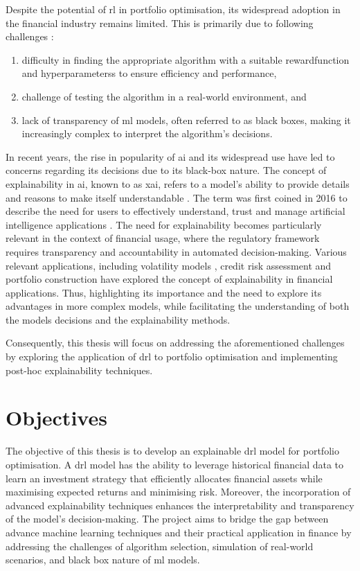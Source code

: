 Despite the potential of \acrshort{rl} in portfolio optimisation, its widespread adoption in the financial industry remains limited. This is primarily due to following challenges \cite{Cortes2024}:
\begin{enumerate}
    \item difficulty in finding the appropriate algorithm with a suitable \gls{rewardfunction} and \glspl{hyperparameters} to ensure efficiency and performance,
    \item challenge of testing the algorithm in a real-world environment, and
    \item lack of transparency of \acrshort{ml} models, often referred to as black boxes, making it increasingly complex to interpret the algorithm's decisions. 
\end{enumerate}

In recent years, the rise in popularity of \acrfull{ai} and its widespread use have led to concerns regarding its decisions due to its black-box nature. The concept of explainability in \acrshort{ai}, known to as \acrfull{xai}, refers to a model's ability to provide details and reasons to make itself understandable \cite{BarredoArrieta2019}. The term was first coined in 2016 to describe the need for users to effectively understand, trust and manage artificial intelligence applications \cite{Gunning2019}. The need for explainability becomes particularly relevant in the context of financial usage, where the regulatory framework requires transparency and accountability in automated decision-making. Various relevant applications, including volatility models \cite{Brigo2021}, credit risk assessment \cite{GarciaCespedes2025} and portfolio construction \cite{Cortes2024} have explored the concept of explainability in financial applications. Thus, highlighting its importance and the need to explore its advantages in more complex models, while facilitating the understanding of both the models decisions and the explainability methods.

Consequently, this thesis will focus on addressing the aforementioned challenges by exploring the application of \acrfull{drl} to portfolio optimisation and implementing post-hoc explainability techniques. 

\section{Objectives} \label{sec:introduction-objectives}

The objective of this thesis is to develop an explainable \acrlong{drl} model for portfolio optimisation. A \acrshort{drl} model has the ability to leverage historical financial data to learn an investment strategy that efficiently allocates financial assets while maximising expected returns and minimising risk. Moreover, the incorporation of advanced explainability techniques enhances the interpretability and transparency of the model's decision-making. The project aims to bridge the gap between advance machine learning techniques and their practical application in finance by addressing the challenges of algorithm selection, simulation of real-world scenarios, and black box nature of \acrshort{ml} models.


